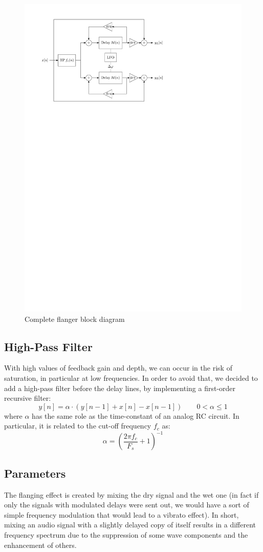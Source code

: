 \begin{figure}
	\centering
	\includegraphics[width=0.7\linewidth]{assets/diagram-full.pdf}
	\caption{Complete flanger block diagram}
	\label{fig:diag}
\end{figure}

\subsection{High-Pass Filter}\label{sec:hpf}

With high values of feedback gain and depth, we can occur in the risk of saturation, in particular at low frequencies. In order to avoid that, we decided to add a high-pass filter before the delay lines, by implementing a first-order recursive filter:
\[
y[n] = \alpha \cdot \left( y[n-1] + x[n] - x[n-1] \right)
\qquad
0 < \alpha \le 1
\]
where $\alpha$ has the same role as the time-constant of an analog RC circuit.
In particular, it is related to the cut-off frequency $f_c$ as:
\[
\alpha = \left( \frac{2 \pi f_c}{F_s} + 1 \right)^{-1}
\]

\subsection{Parameters}\label{sec:parameters}

The flanging effect is created by mixing the dry signal and the wet one (in fact if only the signals with modulated delays were sent out, we would have a sort of simple frequency modulation that would lead to a vibrato effect). In short, mixing an audio signal with a slightly delayed copy of itself results in a different frequency spectrum due to the suppression of some wave components and the enhancement of others.

